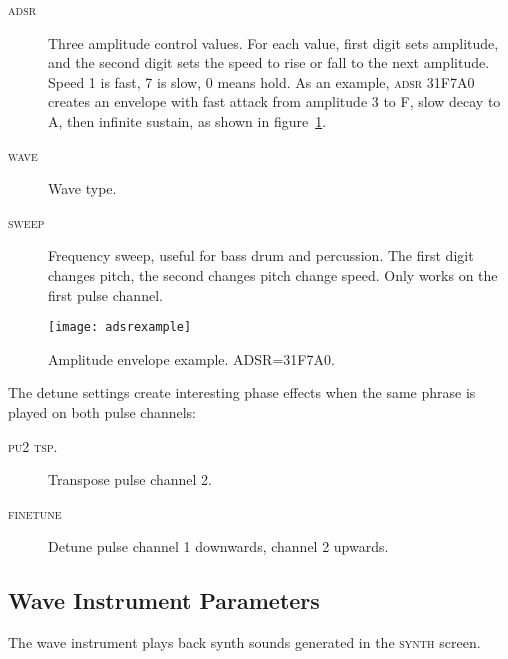 \label{pulse-adsr}
\begin{description}
	\item[\textsc{adsr}] Three amplitude control values. For each value, first digit sets amplitude, and the second digit sets the speed to rise or fall to the next amplitude. Speed 1 is fast, 7 is slow, 0 means hold. As an example, \textsc{adsr} 31F7A0 creates an envelope 
 with fast attack from amplitude 3 to F, slow decay to A, then infinite sustain, as shown in figure~\ref{fig:adsrexample}.
	\item[\textsc{wave}] Wave type.
	\item[\textsc{sweep}] Frequency sweep, useful for bass drum and percussion. The first digit changes pitch, the second changes pitch change speed. Only works on the first pulse channel. 
\end{description}

\begin{figure}[hbtp]
\centering
\texttt{[image: adsrexample]} 
\caption{Amplitude envelope example. ADSR=31F7A0.}
\label{fig:adsrexample}
\end{figure}

The detune settings create interesting phase effects when the same phrase is played on both pulse channels:

\begin{description}
	\item[\textsc{pu2 tsp.}] Transpose pulse channel 2.
	\item[\textsc{finetune}] Detune pulse channel 1 downwards, channel 2 upwards.
\end{description}

\subsection{Wave Instrument Parameters}

The wave instrument plays back synth sounds generated in the \textsc{synth} screen.

\begin{figure}[hbtp]
	\begin{center}
	\end{center}
\end{figure}

